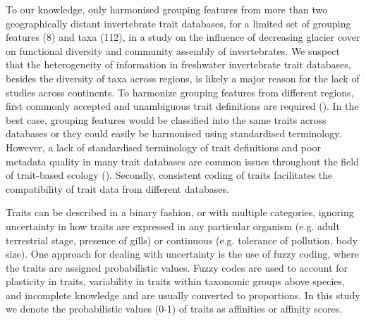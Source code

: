 \documentclass{article}
\begin{document}
To our knowledge, only \citet{brown_functional_2018} harmonised grouping features from more than two geographically distant invertebrate trait databases, for a limited set of grouping features (8) and taxa (112), in a study on the influence of decreasing glacier cover on functional diversity and community assembly of invertebrates. We suspect that the heterogeneity of information in freshwater invertebrate trait databases, besides the diversity of taxa across regions, is likely a major reason for the lack of studies across continents. To harmonize grouping features from different regions, first commonly accepted and unambiguous trait definitions are required (\cite{schneider_towards_2019}). In the best case, grouping features would be classified into the same traits across databases or they could easily be harmonised using standardised terminology. However, a lack of standardised terminology of trait definitions and poor metadata quality in many trait databases are common issues throughout the field of trait-based ecology (\cite{baird_toward_2011, kissling_towards_2018}). Secondly, consistent coding of traits facilitates the compatibility of trait data from different databases. 

Traits can be described in a binary fashion, or with multiple categories, ignoring uncertainty in how traits are expressed in any particular organism (e.g. adult terrestrial stage, presence of gills) or continuous (e.g. tolerance of pollution, body size). One approach for dealing with uncertainty is the use of fuzzy coding, where the traits are assigned probabilistic values. Fuzzy codes are used to account for plasticity in traits, variability in traits within taxonomic groups above species, and incomplete knowledge and are usually converted to proportions. In this study we denote the probabilistic values (0-1) of traits as affinities or affinity scores.
\end{document}
